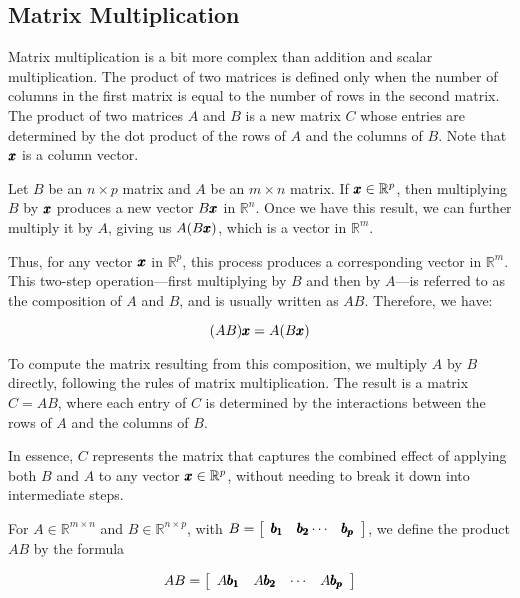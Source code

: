 \subsection*{Matrix Multiplication}
Matrix multiplication is a bit more complex than addition and scalar multiplication. The product of two matrices is defined only when the number of columns in the first matrix is equal to the number of rows in the second matrix. The product of two matrices $A$ and $B$ is a new matrix $C$ whose entries are determined by the dot product of the rows of $A$ and the columns of $B$. Note that $\pmb{x}$ is a column vector.

Let \(B\) be an \(n \times p\) matrix and \(A\) be an \(m \times n\) matrix. If \(\pmb{x} \in \mathbb{R}^p\), then multiplying \(B\) by \(\pmb{x}\) produces a new vector \(B\pmb{x}\) in \(\mathbb{R}^n\). Once we have this result, we can further multiply it by \(A\), giving us \(A(B\pmb{x})\), which is a vector in \(\mathbb{R}^m\).

Thus, for any vector \(\pmb{x}\) in \(\mathbb{R}^p\), this process produces a corresponding vector in \(\mathbb{R}^m\). This two-step operation—first multiplying by \(B\) and then by \(A\)—is referred to as the composition of \(A\) and \(B\), and is usually written as \(AB\). Therefore, we have:

\[
(AB)\pmb{x} = A(B\pmb{x})
\]

To compute the matrix resulting from this composition, we multiply \(A\) by \(B\) directly, following the rules of matrix multiplication. The result is a matrix \(C = AB\), where each entry of \(C\) is determined by the interactions between the rows of \(A\) and the columns of \(B\).

In essence, \(C\) represents the matrix that captures the combined effect of applying both \(B\) and \(A\) to any vector \(\pmb{x} \in \mathbb{R}^p\), without needing to break it down into intermediate steps.

\begin{definition}
    For $A \in \mathbb{R}^{m \times n}$ and $B \in \mathbb{R}^{n \times p}$, with $B=\left[\begin{array}{lll}\pmb{b_1} & \pmb{b_2} \cdots & \pmb{b_p}\end{array}\right]$, we define the product $A B$ by the formula

\[
A B=\left[\begin{array}{llll}
A \pmb{b_1} & A \pmb{b_2} & \cdots & A \pmb{b_p}
\end{array}\right]
\]

\end{definition}

